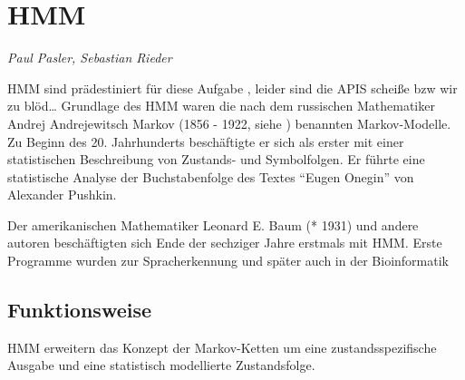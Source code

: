 ﻿\section{\acl{HMM}}
\textit{Paul Pasler, Sebastian Rieder}

\acl{HMM} sind prädestiniert für diese Aufgabe \cite{mmmFink}, leider sind die APIS scheiße bzw wir zu blöd\ldots
\cite{rabiner}
Grundlage des \acl{HMM} waren die nach dem russischen Mathematiker Andrej Andrejewitsch Markov 
(1856 - 1922, siehe \cite{wiki:markov}) benannten Markov-Modelle. Zu Beginn des 20. Jahrhunderts 
beschäftigte er sich als erster mit einer statistischen Beschreibung von Zustands- und Symbolfolgen. 
Er führte eine statistische Analyse der Buchstabenfolge des Textes ``Eugen Onegin'' von Alexander 
Pushkin.

Der amerikanischen Mathematiker Leonard E. Baum (* 1931) und andere autoren beschäftigten sich Ende der 
sechziger Jahre erstmals mit \acl{HMM}. Erste Programme wurden zur Spracherkennung und später auch in der Bioinformatik  
 

\subsection{Funktionsweise}
\acl{HMM} erweitern das Konzept der Markov-Ketten um eine zustandsspezifische Ausgabe und eine statistisch 
modellierte Zustandsfolge.


\ubsection
